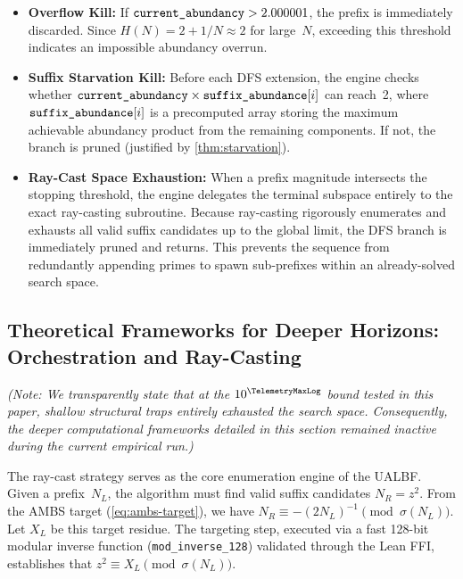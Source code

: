 \begin{itemize}
  \item \textbf{Overflow Kill:}
    If $\texttt{current\_\allowbreak{}abundancy} > 2.000001$, the
    prefix is immediately discarded.  Since
    $H(N) = 2 + 1/N \approx 2$ for large~$N$, exceeding this
    threshold indicates an impossible abundancy overrun.

  \item \textbf{Suffix Starvation Kill:}
    Before each DFS extension, the engine checks whether
    $\texttt{current\_\allowbreak{}abundancy}
     \times \texttt{suffix\_\allowbreak{}abundance}[i]$
    can reach~2, where $\texttt{suffix\_\allowbreak{}abundance}[i]$ is
    a precomputed array storing the maximum achievable abundancy product
    from the remaining components.  If not, the branch is pruned
    (justified by \cref{thm:starvation}).

  \item \textbf{Ray-Cast Space Exhaustion:}
    When a prefix magnitude intersects the stopping threshold, the engine delegates the terminal subspace entirely to the exact ray-casting subroutine. Because ray-casting rigorously enumerates and exhausts all valid suffix candidates up to the global limit, the DFS branch is immediately pruned and returns. This prevents the sequence from redundantly appending primes to spawn sub-prefixes within an already-solved search space.
\end{itemize}

\subsection{Theoretical Frameworks for Deeper Horizons: Orchestration and Ray-Casting}
\label{subsec:ray_casting}

\emph{(Note: We transparently state that at the $10^{\TelemetryMaxLog}$ bound tested in this paper, shallow structural traps entirely exhausted the search space. Consequently, the deeper computational frameworks detailed in this section remained inactive during the current empirical run.)}

The ray-cast strategy serves as the core enumeration engine of the
UALBF\@.  Given a prefix~$N_L$, the algorithm must find valid suffix
candidates $N_R = z^2$.  From the AMBS target
(\cref{eq:ambs-target}), we have
$N_R \equiv -(2N_L)^{-1} \pmod{\sigma(N_L)}$.  Let $X_L$ be this
target residue.  The targeting step, executed via a fast 128-bit
modular inverse function
(\texttt{mod\_\allowbreak{}inverse\_\allowbreak{}128}) validated through
the Lean FFI, establishes that
$z^2 \equiv X_L \pmod{\sigma(N_L)}$.

